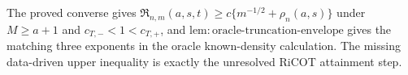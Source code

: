 The proved converse gives \(\mathfrak R_{n,m}(a,s,t)\ge c\{m^{-1/2}+\rho_n(a,s)\}\) under \(M\ge a+1\) and \(c_{T,-}<1<c_{T,+}\), and \(\mathrm{lem:oracle\text{-}truncation\text{-}envelope}\) gives the matching three exponents in the oracle known-density calculation. The missing data-driven upper inequality is exactly the unresolved RiCOT attainment step.